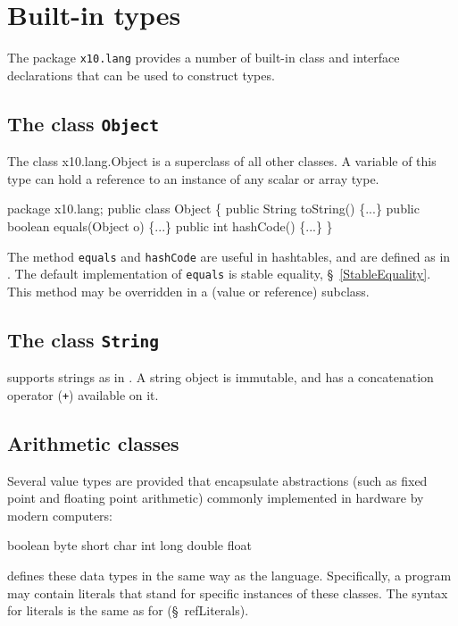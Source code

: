 \section{Built-in types}
\cbstart 

The package {\tt x10.lang} provides a number of built-in class and
interface declarations that can be used to construct types.

\subsection{The class {\tt Object}}\label{Object}
The class {\cf x10.lang.Object} is a superclass of all other classes.
A variable of this type can hold a reference to an instance of any
scalar or array type.

\begin{x10}
package x10.lang;
public class Object \{
  public String toString() \{...\}
  public boolean equals(Object o) \{...\}
  public int hashCode() \{...\}
\}
\end{x10}

The method {\tt equals} and {\tt hashCode} are useful in hashtables,
and are defined as in \java. The default implementation of {\tt equals}
is stable equality, \S~\ref{StableEquality}. This method may be overridden
in a (value or reference) subclass.

\subsection{The class {\tt String}}
\Xten{} supports strings as in \java{}. A string object is immutable,
and has a concatenation operator ({\tt +})  available on it.

\subsection{Arithmetic classes}
Several value types are provided that encapsulate
abstractions (such as fixed point and floating point arithmetic)
commonly implemented in hardware by modern computers:

\begin{x10}
boolean byte short char 
int long 
double float 
\end{x10}

\XtenCurrVer{} defines these data types in the same way as the 
\java{} language. Specifically, a program may contain literals
that stand for specific instances of these classes. The syntax
for literals is the same as for \java{} (\S~ref{Literals}).

